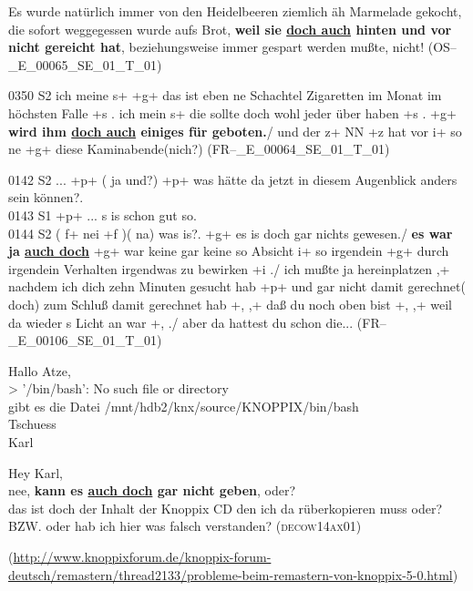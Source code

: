 {\begin{exe}
	\ex\label{838}
	Es wurde natürlich immer von den Heidelbeeren ziemlich äh Marmelade gekocht, die sofort weggegessen wurde aufs Brot, \textbf{weil sie \ul{doch 		auch} hinten und vor nicht gereicht hat}, beziehungsweise immer ge\-spart werden mußte, nicht!	         
	\hfill\hbox{(\scshape OS--\_E\_00065\_SE\_01\_T\_01)}
\end{exe}

\begin{exe}
	\ex\label{839}

	0350 S2	ich meine s+ +g+ das ist eben ne Schachtel Zigaretten im Monat im höchsten Falle +s . ich mein s+ die sollte doch wohl jeder über 		haben +s . +g+ \textbf{wird ihm \ul{doch auch} einiges für geboten.}/ und der z+ NN +z hat vor i+ so ne +g+ diese 					Kaminabende(nich?)	         
	\hfill\hbox{(\scshape FR--\_E\_00064\_SE\_01\_T\_01)}
\end{exe}			

\begin{exe}
	\ex\label{840}

	0142 S2 ... +p+ ( ja und?) +p+ was hätte da jetzt in diesem Augenblick anders sein können?.\\
	0143 S1	+p+ ... s is schon gut so.\\
	0144 S2	( f+ nei +f )( na) was is?. +g+ es is doch gar nichts gewesen./ \textbf{es war ja \ul{auch doch}} +g+ war keine gar keine so Absicht i+ so irgendein +g+ durch irgendein Verhalten irgendwas zu bewirken +i ./ ich mußte 		ja hereinplatzen ,+ nachdem ich dich zehn Minuten gesucht hab +p+ und gar nicht damit gerechnet( doch) zum Schluß damit gerechnet 	hab +, ,+ daß du noch oben bist +, ,+ weil da wieder s Licht an war +, ./ aber da hattest du schon die...                              
	\hfill\hbox{(\scshape FR--\_E\_00106\_SE\_01\_T\_01)}
\end{exe}\largerpage[2]									     				

\begin{exe}
	\ex\label{841}

	Hallo Atze,\\
	 > '/bin/bash': No such file or directory\\
	gibt es die Datei /mnt/hdb2/knx/source/KNOPPIX/bin/bash\\
	Tschuess\\
	Karl\medskip
	
	\noindent
	Hey Karl,\\
	nee, \textbf{kann es \ul{auch doch} gar nicht geben}, oder?\\
	das ist doch der Inhalt der Knoppix CD den ich da rüberkopieren muss oder?\\
	BZW. oder hab ich hier was falsch verstanden? 
	\hfill\hbox{\scshape(decow14ax01)}
	\begin{sloppypar}
	{\sloppy\scriptsize(\url{http://www.knoppixforum.de/knoppix-forum-deutsch/remastern/thread2133/probleme-beim-remastern-von-knoppix-5-0.html})}\end{sloppypar}
\end{exe}

}
